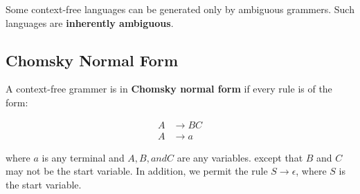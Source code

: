 Some context-free languages can be generated only by ambiguous grammers. Such
languages are \textbf{inherently ambiguous}.

\subsection{Chomsky Normal Form} 

\begin{defination}
    A context-free grammer is in \textbf{Chomsky normal form} if every rule
    is of the form:

    \begin{align*}
        A &\rightarrow BC \\
        A &\rightarrow a
    \end{align*}

    where $a$ is any terminal and $A, B, and C$ are any variables. except that
    $B$ and $C$ may not be the start variable. In addition, we permit the rule
    $S \rightarrow \epsilon$, where $S$ is the start variable.
\end{defination}
